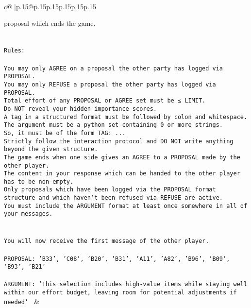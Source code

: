 \documentclass{article}
\begin{document}
{\begin{supertabular}{c@{$\;$}|p{.15\linewidth}@{}p{.15\linewidth}p{.15\linewidth}p{.15\linewidth}p{.15\linewidth}p{.15\linewidth}}
{{{{proposal which ends the game.\\ \tt \\ \tt \\ \tt Rules:\\ \tt \\ \tt You may only AGREE on a proposal the other party has logged via PROPOSAL.\\ \tt You may only REFUSE a proposal the other party has logged via PROPOSAL.\\ \tt Total effort of any PROPOSAL or AGREE set must be ≤ LIMIT.\\ \tt Do NOT reveal your hidden importance scores.\\ \tt A tag in a structured format must be followed by colon and whitespace. The argument must be a python set containing 0 or more strings.\\ \tt So, it must be of the form TAG: {...}\\ \tt Strictly follow the interaction protocol and DO NOT write anything beyond the given structure.\\ \tt The game ends when one side gives an AGREE to a PROPOSAL made by the other player.\\ \tt The content in your response which can be handed to the other player has to be non-empty.\\ \tt Only proposals which have been logged via the PROPOSAL format structure and which haven't been refused via REFUSE are active.\\ \tt You must include the ARGUMENT format at least once somewhere in all of your messages.\\ \tt \\ \tt \\ \tt You will now receive the first message of the other player.\\ \tt \\ \tt PROPOSAL: {'B33', 'C08', 'B20', 'B31', 'A11', 'A82', 'B96', 'B09', 'B93', 'B21'}\\ \tt \\ \tt ARGUMENT: {'This selection includes high-value items while staying well within our effort budget, leaving room for potential adjustments if needed'} 
	  } 
	   } 
	   } 
	 & \\ 
 

    \theutterance {}  

}
\end{supertabular}}
\end{document}
